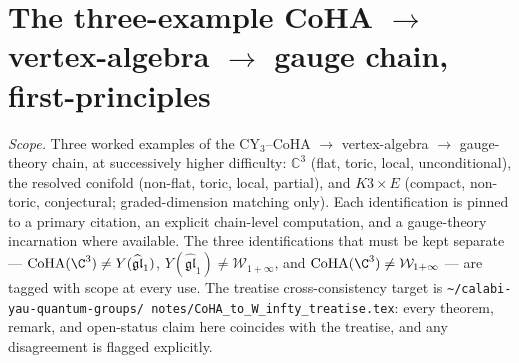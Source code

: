 \section{The three-example CoHA $\to$ vertex-algebra $\to$ gauge chain, first-principles}
\label{w17:sec:coha-c3-to-w-infty-agent13}

\providecommand{\ClaimStatusTheorem}{\textsc{[theorem, cited]}}
\providecommand{\ClaimStatusConjectured}{\textsc{[conjectural]}}
\providecommand{\ClaimStatusDefinition}{\textsc{[definition]}}
\providecommand{\ClaimStatusDerivation}{\textsc{[first-principles derivation]}}
\providecommand{\ClaimStatusOpen}{\textsc{[open]}}
\providecommand{\ClaimStatusProvedElsewhere}{\textsc{[proved elsewhere]}}
\providecommand{\CoHA}{\mathrm{CoHA}}
\providecommand{\Sh}{\mathrm{Sh}}
\providecommand{\Wilpha}{\mathcal{W}_{1+\infty}}
\providecommand{\gghone}{\widehat{\mathfrak{gl}}_1}
\providecommand{\hCS}{\mathrm{hCS}}
\providecommand{\Jac}{J}
\providecommand{\Fact}{\mathrm{Fact}}
\providecommand{\Crit}{\mathrm{Crit}}
\providecommand{\Hilb}{\mathrm{Hilb}}
\providecommand{\Obs}{\mathrm{Obs}}
\providecommand{\eps}{\epsilon}
\providecommand{\Zinst}{Z^{\mathrm{inst}}_{\Omega}}
\providecommand{\PhiFA}{\Phi^{\mathrm{FA}}}
\providecommand{\SpCh}{\mathrm{Sp}^{\mathrm{ch}}}
\providecommand{\Mred}{\mathcal{M}^{\mathrm{red}}_{DT}}
\providecommand{\Auts}{\mathrm{Aut}_s}
\providecommand{\gBPS}{\mathfrak{g}_{\mathrm{BPS}}}
\providecommand{\gDelta}{\mathfrak{g}_{\Delta_5}}
\providecommand{\bY}{\mathbb{Y}}
\providecommand{\Qcon}{Q_{\mathrm{con}}}

\emph{Scope.} Three worked examples of the CY$_3$--CoHA $\to$ vertex-algebra $\to$
gauge-theory chain, at successively higher difficulty: $\mathbb{C}^3$ (flat, toric,
local, unconditional), the resolved conifold (non-flat, toric, local, partial), and
$K3 \times E$ (compact, non-toric, conjectural; graded-dimension matching only).
Each identification is pinned to a primary citation, an explicit chain-level
computation, and a gauge-theory incarnation where available. The three identifications
that must be kept separate --- $\CoHA(\C^3) \neq Y(\gghone)$, $Y(\gghone) \neq \Wilpha$,
and $\CoHA(\C^3) \neq \Wilpha$ --- are tagged with scope at every use. The treatise
cross-consistency target is \texttt{\textasciitilde /calabi-yau-quantum-groups/
notes/CoHA\_to\_W\_infty\_treatise.tex}: every theorem, remark, and open-status
claim here coincides with the treatise, and any disagreement is flagged explicitly.

